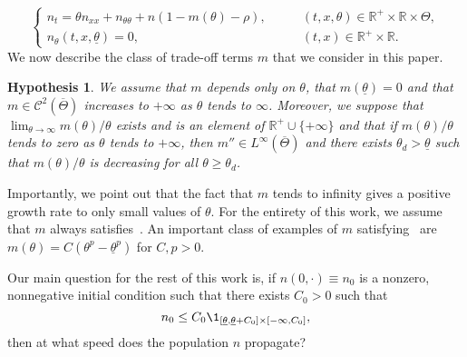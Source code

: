 \documentclass[11pt]{article}    %
\newtheorem{hypothesis}[theorem]{Hypothesis}
\newcommand{\R}{\mathbb{R}}
\begin{document}
\begin{equation}\label{eq:main}
\begin{cases}
n_t = \theta n_{xx} + n_{\theta\theta} +  n \left( 1 - m(\theta) - \rho\right), &\qquad (t,x,\theta) \in \R^+ \times \R \times \Theta,\\
n_\theta(t,x,\underline\theta) = 0, & \qquad (t,x) \in \R^+ \times \R. 
\end{cases}
\end{equation}
We now describe the class of trade-off terms $m$ that we consider in this paper.
%
\begin{hypothesis}\label{hyp:m} We assume that $m$ depends only on $\theta$, that $m(\underline\theta) = 0$ and that $m \in \mathcal{C}^2(\overline \Theta)$ increases to $+\infty$ as $\theta$ tends to $\infty$. Moreover, we suppose that $\lim_{\theta\to\infty} m(\theta)/\theta$ exists and is an element of $\R^+\cup\{+\infty\}$ and that if $m(\theta)/\theta$ tends to zero as $\theta$ tends to $+\infty$, then $m'' \in L^\infty\left(\overline\Theta\right)$ and there exists $\theta_d > \underline\theta$ such that $m(\theta)/\theta$ is decreasing for all $\theta \geq \theta_d$.
\end{hypothesis}
Importantly, we point out that the fact that $m$ tends to infinity gives a positive growth rate to only small values of $\theta$. For the entirety of this work, we assume that $m$ always satisfies~.  An important class of examples of $m$ satisfying~ are $m(\theta) = C(\theta^p - \underline\theta^p)$ for $C, p > 0$.

Our main question for the rest of this work is, if $n(0,\cdot) \equiv n_0$ is a nonzero, nonnegative initial condition such that there exists $C_0 > 0$ such that 
\begin{equation}\label{eq:n_0}
		n_0 \leq C_0 \1_{[\underline\theta, \underline\theta+C_0]\times[-\infty,C_0]},
\end{equation}
then at what speed does the population $n$ propagate?
\end{document}
